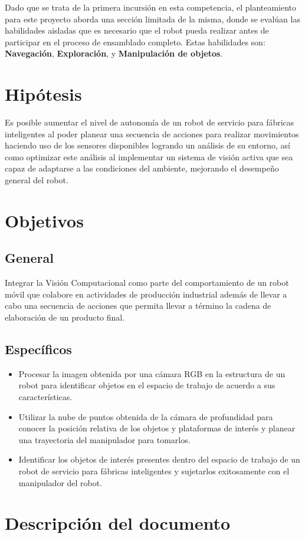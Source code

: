 Dado que se trata de la primera incursión en esta competencia, el planteamiento para este proyecto aborda una sección limitada de la misma, donde se evalúan las habilidades aisladas que es necesario que el robot pueda realizar antes de participar en el proceso de ensamblado completo. Estas habilidades son: \textbf{Navegación}, \textbf{Exploración}, y \textbf{Manipulación de objetos}. 

\section{Hipótesis}
Es posible aumentar el nivel de autonomía de un robot de servicio para fábricas inteligentes al poder planear una secuencia de acciones para realizar movimientos haciendo uso de los sensores disponibles logrando un análisis de su entorno, así como optimizar este análisis al implementar un sistema de visión activa que sea capaz de adaptarse a las condiciones del ambiente, mejorando el desempeño general del robot.

\section{Objetivos}
\subsection{General}
Integrar la Visión Computacional como parte del comportamiento de un robot móvil que colabore en actividades de producción industrial además de  llevar a cabo una secuencia de acciones que permita llevar a término la cadena de elaboración de un producto final.
\subsection{Específicos}
\begin{itemize}
    \item Procesar la imagen obtenida por una cámara RGB en la estructura de un robot para identificar objetos en el espacio de trabajo de acuerdo a sus características.
    \item Utilizar la nube de puntos  obtenida de la cámara de profundidad para conocer la posición relativa de los objetos y plataformas de interés y planear una trayectoria del manipulador para tomarlos. 
    \item Identificar los objetos de interés presentes dentro del espacio de trabajo de un robot de servicio para fábricas inteligentes y sujetarlos exitosamente con el manipulador del robot.
\end{itemize}
\section{Descripción del documento}